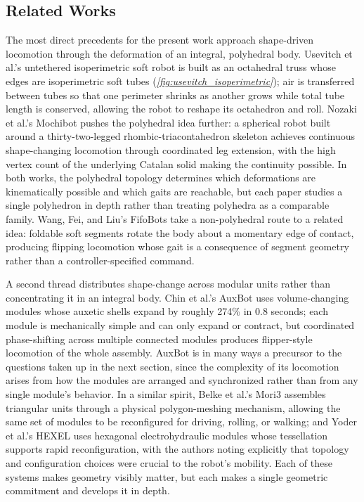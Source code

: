 \subsection{Related Works}
\label{subsec:mc-related}

The most direct precedents for the present work approach shape-driven locomotion through the deformation of an integral, polyhedral body. Usevitch et al.'s untethered isoperimetric soft robot \cite{usevitchUntetheredIsoperimetricSoft2020} is built as an octahedral truss whose edges are isoperimetric soft tubes (\textit{\cref{fig:usevitch_isoperimetric}}); air is transferred between tubes so that one perimeter shrinks as another grows while total tube length is conserved, allowing the robot to reshape its octahedron and roll. Nozaki et al.'s Mochibot \cite{nozaki_continuous_2018} pushes the polyhedral idea further: a spherical robot built around a thirty-two-legged rhombic-triacontahedron skeleton achieves continuous shape-changing locomotion through coordinated leg extension, with the high vertex count of the underlying Catalan solid making the continuity possible. In both works, the polyhedral topology determines which deformations are kinematically possible and which gaits are reachable, but each paper studies a single polyhedron in depth rather than treating polyhedra as a comparable family. Wang, Fei, and Liu's FifoBots \cite{wang_fifobots_2019} take a non-polyhedral route to a related idea: foldable soft segments rotate the body about a momentary edge of contact, producing flipping locomotion whose gait is a consequence of segment geometry rather than a controller-specified command.

A second thread distributes shape-change across modular units rather than concentrating it in an integral body. Chin et al.'s AuxBot \cite{chinFlipperStyleLocomotionStrong2023} uses volume-changing modules whose auxetic shells expand by roughly 274\% in 0.8 seconds; each module is mechanically simple and can only expand or contract, but coordinated phase-shifting across multiple connected modules produces flipper-style locomotion of the whole assembly. AuxBot is in many ways a precursor to the questions taken up in the next section, since the complexity of its locomotion arises from how the modules are arranged and synchronized rather than from any single module's behavior. In a similar spirit, Belke et al.'s Mori3 \cite{belke_morphological_2023} assembles triangular units through a physical polygon-meshing mechanism, allowing the same set of modules to be reconfigured for driving, rolling, or walking; and Yoder et al.'s HEXEL \cite{yoderHexagonalElectrohydraulicModules2024} uses hexagonal electrohydraulic modules whose tessellation supports rapid reconfiguration, with the authors noting explicitly that topology and configuration choices were crucial to the robot's mobility. Each of these systems makes geometry visibly matter, but each makes a single geometric commitment and develops it in depth.

